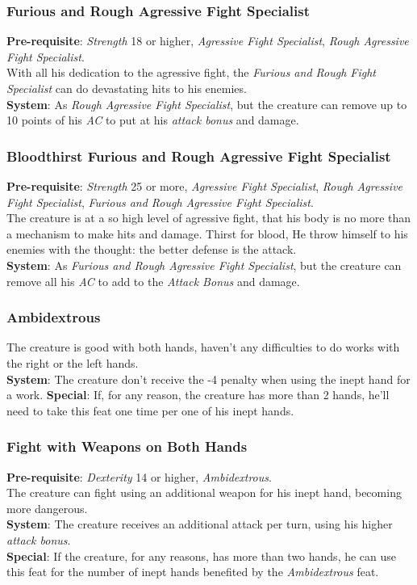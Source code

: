 \documentclass[ letterpaper,12pt]{article}
\begin{document}
\subsubsection{Furious and Rough Agressive Fight Specialist}
{\bf Pre-requisite}: {\it Strength} 18 or higher, {\it Agressive Fight Specialist}, {\it Rough Agressive Fight Specialist}.\\
With all his dedication to the agressive fight, the {\it Furious and Rough Fight Specialist} can do devastating hits to his enemies.\\
{\bf System}: As {\it Rough Agressive Fight Specialist}, but the creature can remove up to 10 points of his {\it AC} to put at his {\it attack bonus} and damage.

\subsubsection{Bloodthirst Furious and Rough Agressive Fight Specialist}
{\bf Pre-requisite}: {\it Strength} 25 or more, {\it Agressive Fight Specialist}, {\it Rough Agressive Fight Specialist}, {\it Furious and Rough Agressive Fight Specialist}.\\
The creature is at a so high level of agressive fight, that his body is no more than a mechanism to make hits and damage. Thirst for blood, He throw himself to his enemies with the thought: the better defense is the attack.\\
{\bf System}: As {\it Furious and Rough Agressive Fight Specialist}, but the creature can remove all his {\it AC} to add to the {\it Attack Bonus} and damage.

\subsubsection{Ambidextrous}
The creature is good with both hands, haven't any difficulties to do works with the right or the left hands.\\
{\bf System}: The creature don't receive the -4 penalty when using the inept hand for a work.
{\bf Special}: If, for any reason, the creature has more than 2 hands, he'll need to take this feat one time per one of his inept hands.\\

\subsubsection{Fight with Weapons on Both Hands}
{\bf Pre-requisite}: {\it Dexterity} 14 or higher, {\it Ambidextrous}.\\
The creature can fight using an additional weapon for his inept hand, becoming more dangerous.\\
{\bf System}: The creature receives an additional attack per turn, using his higher {\it attack bonus}.\\
{\bf Special}: If the creature, for any reasons, has more than two hands, he can use this feat for the number of inept hands benefited by the {\it Ambidextrous} feat.
\end{document}
